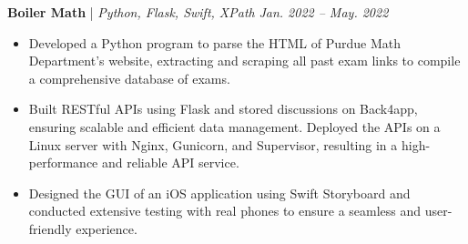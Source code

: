 \documentclass[hidelinks, 11pt,letterpaper]{article}
\newcommand{\resumeItemListStart}{
    \begin{itemize}[itemsep=1pt, parsep=0pt, topsep=0pt]
}
\newcommand{\resumeItemListEnd}{
    \end{itemize}
}
\begin{document}
\textbf{Boiler Math} | \emph{Python, Flask, Swift, XPath} \hfill \textit {Jan. 2022 -- May. 2022}

\resumeItemListStart
    \item Developed a Python program to parse the HTML of Purdue Math Department's website, extracting and scraping all past exam links to compile a comprehensive database of exams.
    \item Built RESTful APIs using Flask and stored discussions on Back4app, ensuring scalable and efficient data management. Deployed the APIs on a Linux server with Nginx, Gunicorn, and Supervisor, resulting in a high-performance and reliable API service.
    \item Designed the GUI of an iOS application using Swift Storyboard and conducted extensive testing with real phones to ensure a seamless and user-friendly experience.
\resumeItemListEnd

	
\end{document}
